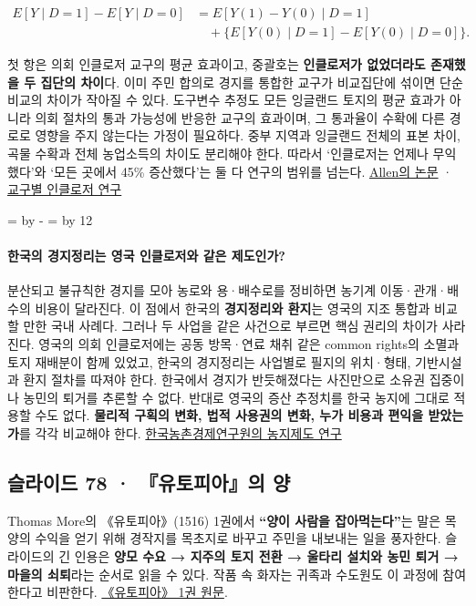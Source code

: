 \documentclass[10pt,a4paper]{article}
\newcommand{\ReserveQuestionSpace}{%
  \par\begingroup
  \dimen0=\pagegoal \advance\dimen0 by -\pagetotal
  \dimen2=\baselineskip \multiply\dimen2 by 12
  \ifdim\dimen0<\dimen2 \newpage\fi
  \endgroup}
\begin{document}
\[
\begin{aligned}
E[Y\mid D=1]-E[Y\mid D=0]
&=E[Y(1)-Y(0)\mid D=1]\\
&\quad+\{E[Y(0)\mid D=1]-E[Y(0)\mid D=0]\}.
\end{aligned}
\]

첫 항은 의회 인클로저 교구의 평균 효과이고, 중괄호는 \textbf{인클로저가 없었더라도 존재했을 두 집단의 차이}다. 이미 주민 합의로 경지를 통합한 교구가 비교집단에 섞이면 단순 비교의 차이가 작아질 수 있다. 도구변수 추정도 모든 잉글랜드 토지의 평균 효과가 아니라 의회 절차의 통과 가능성에 반응한 교구의 효과이며, 그 통과율이 수확에 다른 경로로 영향을 주지 않는다는 가정이 필요하다. 중부 지역과 잉글랜드 전체의 표본 차이, 곡물 수확과 전체 농업소득의 차이도 분리해야 한다. 따라서 ‘인클로저는 언제나 무익했다’와 ‘모든 곳에서 45\% 증산했다’는 둘 다 연구의 범위를 넘는다. \href{https://ideas.repec.org/a/seh/journl/y2002i26p13-32.html}{Allen의 논문} · \href{https://www.nber.org/system/files/working\_papers/w29772/w29772.pdf}{교구별 인클로저 연구}\par

\ReserveQuestionSpace
\paragraph{한국의 경지정리는 영국 인클로저와 같은 제도인가?}
분산되고 불규칙한 경지를 모아 농로와 용·배수로를 정비하면 농기계 이동·관개·배수의 비용이 달라진다. 이 점에서 한국의 \textbf{경지정리와 환지}는 영국의 지조 통합과 비교할 만한 국내 사례다. 그러나 두 사업을 같은 사건으로 부르면 핵심 권리의 차이가 사라진다. 영국의 의회 인클로저에는 공동 방목·연료 채취 같은 common rights의 소멸과 토지 재배분이 함께 있었고, 한국의 경지정리는 사업별로 필지의 위치·형태, 기반시설과 환지 절차를 따져야 한다. 한국에서 경지가 반듯해졌다는 사진만으로 소유권 집중이나 농민의 퇴거를 추론할 수 없다. 반대로 영국의 증산 추정치를 한국 농지에 그대로 적용할 수도 없다. \textbf{물리적 구획의 변화, 법적 사용권의 변화, 누가 비용과 편익을 받았는가}를 각각 비교해야 한다. \href{https://repository.krei.re.kr/handle/2018.oak/13824}{한국농촌경제연구원의 농지제도 연구}\par

\subsection{슬라이드 78 · 『유토피아』의 양}
Thomas More의 《유토피아》(1516) 1권에서 \textbf{“양이 사람을 잡아먹는다”}는 말은 목양의 수익을 얻기 위해 경작지를 목초지로 바꾸고 주민을 내보내는 일을 풍자한다. 슬라이드의 긴 인용은 \textbf{양모 수요 → 지주의 토지 전환 → 울타리 설치와 농민 퇴거 → 마을의 쇠퇴}라는 순서로 읽을 수 있다. 작품 속 화자는 귀족과 수도원도 이 과정에 참여한다고 비판한다. \href{https://www.gutenberg.org/files/2130/2130-h/2130-h.htm}{《유토피아》 1권 원문}.\par
\end{document}
